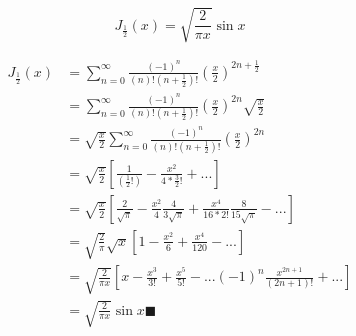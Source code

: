 \begin{prob}
     $$J_{\frac{1}{2}}(x) = \sqrt{\frac{2}{\pi x}}\sin{x}$$
\end{prob}
\begin{mdframed}
    \begin{align*}
        J_{\frac{1}{2}}(x) & = \sum_{n=0}^\infty \frac{(-1)^n}{(n)!(n+\frac{1}{2})!}(\frac{x}{2})^{2n+\frac{1}{2}}\\
        & = \sum_{n=0}^\infty \frac{(-1)^n}{(n)!(n+\frac{1}{2})!}(\frac{x}{2})^{2n} \sqrt{\frac{x}{2}}\\
        & =\sqrt{\frac{x}{2}} \sum_{n=0}^\infty \frac{(-1)^n}{(n)!(n+\frac{1}{2})!}(\frac{x}{2})^{2n} \\
        & =\sqrt{\frac{x}{2}}[\frac{1}{(\frac{1}{2}!)}-\frac{x^2}{4*\frac{3}{2}!}+...] \\
        & =\sqrt{\frac{x}{2}}[\frac{2}{\sqrt{\pi}}-\frac{x^2}{4}\frac{4}{3\sqrt{\pi}}+\frac{x^4}{16*2!}\frac{8}{15\sqrt{\pi}}-...] \\
        & =\sqrt{\frac{2}{\pi}}\sqrt{x}[1-\frac{x^2}{6}+\frac{x^4}{120}-...] \\
        & =\sqrt{\frac{2}{\pi x}}[x-\frac{x^3}{3!}+\frac{x^5}{5!}-...(-1)^{n}\frac{x^{2n+1}}{(2n+1)!}+...] \\
        & = \sqrt{\frac{2}{\pi x}} \sin{x} \blacksquare\\
    \end{align*}
\end{mdframed}